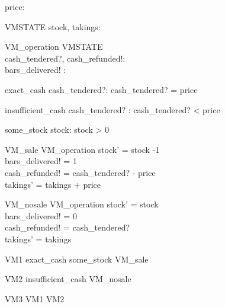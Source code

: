\documentclass{article}
\begin{document}
\begin{zed}
price:\nat
\end{zed}

\begin{schema}{VMSTATE}
stock, takings: \nat
\end{schema}

\begin{schema}{VM\_operation}
\Delta VMSTATE \\
cash\_tendered?, cash\_refunded!: \nat \\
bars\_delivered! : \nat
\end{schema}

\begin{schema}{exact\_cash}
cash\_tendered?: \nat
\where
cash\_tendered? = price
\end{schema}

\begin{schema}{insufficient\_cash}
cash\_tendered? : \nat
\where
cash\_tendered? < price
\end{schema}

\begin{schema}{some\_stock}
stock: \nat
\where
stock > 0
\end{schema}

\begin{schema}{VM\_sale}
VM\_operation
\where
stock' = stock -1 \\
bars\_delivered! = 1 \\
cash\_refunded! = cash\_tendered? - price \\
takings' = takings + price
\end{schema}

\begin{schema}{VM\_nosale}
VM\_operation
\where
stock' = stock \\
bars\_delivered! = 0 \\
cash\_refunded! = cash\_tendered?\\
takings' = takings
\end{schema}

\begin{zed}
VM1  exact\_cash \land some\_stock \land VM\_sale
\end{zed}

\begin{zed}
VM2  insufficient\_cash \land VM\_nosale
\end{zed}

\begin{zed}
VM3  VM1 \lor VM2
\end{zed}
\end{document}
